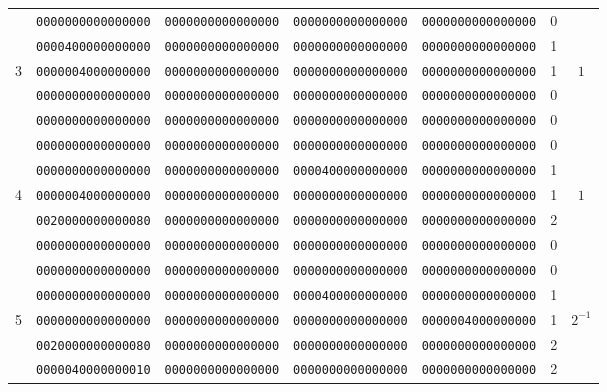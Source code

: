\begin{table}[!tb]
\begin{center}
{\begin{tabular}{ccccccc}
      & {\tt 0000000000000000} & {\tt 0000000000000000} & {\tt 0000000000000000} & {\tt 0000000000000000} & 0  & \\
      & {\tt 0000400000000000} & {\tt 0000000000000000} & {\tt 0000000000000000} & {\tt 0000000000000000} & 1  & \\
3     & {\tt 0000004000000000} & {\tt 0000000000000000} & {\tt 0000000000000000} & {\tt 0000000000000000} & 1  & $1$\\
      & {\tt 0000000000000000} & {\tt 0000000000000000} & {\tt 0000000000000000} & {\tt 0000000000000000} & 0  & \\
      & {\tt 0000000000000000} & {\tt 0000000000000000} & {\tt 0000000000000000} & {\tt 0000000000000000} & 0  & \\ \hline

      & {\tt 0000000000000000} & {\tt 0000000000000000} & {\tt 0000000000000000} & {\tt 0000000000000000} & 0  & \\
      & {\tt 0000000000000000} & {\tt 0000000000000000} & {\tt 0000400000000000} & {\tt 0000000000000000} & 1  & \\
4     & {\tt 0000004000000000} & {\tt 0000000000000000} & {\tt 0000000000000000} & {\tt 0000000000000000} & 1  & $1$\\
      & {\tt 0020000000000080} & {\tt 0000000000000000} & {\tt 0000000000000000} & {\tt 0000000000000000} & 2  & \\
      & {\tt 0000000000000000} & {\tt 0000000000000000} & {\tt 0000000000000000} & {\tt 0000000000000000} & 0  & \\ \hline

      & {\tt 0000000000000000} & {\tt 0000000000000000} & {\tt 0000000000000000} & {\tt 0000000000000000} & 0  & \\
      & {\tt 0000000000000000} & {\tt 0000000000000000} & {\tt 0000400000000000} & {\tt 0000000000000000} & 1  & \\
5     & {\tt 0000000000000000} & {\tt 0000000000000000} & {\tt 0000000000000000} & {\tt 0000004000000000} & 1  & $2^{-1}$\\
      & {\tt 0020000000000080} & {\tt 0000000000000000} & {\tt 0000000000000000} & {\tt 0000000000000000} & 2  & \\
      & {\tt 0000040000000010} & {\tt 0000000000000000} & {\tt 0000000000000000} & {\tt 0000000000000000} & 2  & \\ \hline


\end{tabular}}
\end{center}
\end{table}
